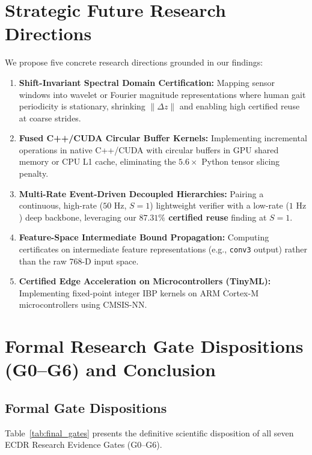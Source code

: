 \documentclass[journal,onecolumn,10pt]{IEEEtran}
\newcommand{\code}[1]{{\small\ttfamily\nolinkurl{#1}}}
\theoremstyle{remark}
\begin{document}
\section{Strategic Future Research Directions}
We propose five concrete research directions grounded in our findings:
\begin{enumerate}[leftmargin=1.4em]
  \item \textbf{Shift-Invariant Spectral Domain Certification:} Mapping sensor windows into wavelet or Fourier magnitude representations where human gait periodicity is stationary, shrinking $\|\Delta z\|$ and enabling high certified reuse at coarse strides.
  \item \textbf{Fused C++/CUDA Circular Buffer Kernels:} Implementing incremental operations in native C++/CUDA with circular buffers in GPU shared memory or CPU L1 cache, eliminating the $5.6\times$ Python tensor slicing penalty.
  \item \textbf{Multi-Rate Event-Driven Decoupled Hierarchies:} Pairing a continuous, high-rate ($50\text{ Hz}$, $S=1$) lightweight verifier with a low-rate ($1\text{ Hz}$) deep backbone, leveraging our \textbf{$87.31\%$ certified reuse} finding at $S=1$.
  \item \textbf{Feature-Space Intermediate Bound Propagation:} Computing certificates on intermediate feature representations (e.g., \code{conv3} output) rather than the raw 768-D input space.
  \item \textbf{Certified Edge Acceleration on Microcontrollers (TinyML):} Implementing fixed-point integer IBP kernels on ARM Cortex-M microcontrollers using CMSIS-NN.
\end{enumerate}

\section{Formal Research Gate Dispositions (G0--G6) and Conclusion}

\subsection{Formal Gate Dispositions}
Table~\ref{tab:final_gates} presents the definitive scientific disposition of all seven ECDR Research Evidence Gates (G0--G6).
\end{document}
